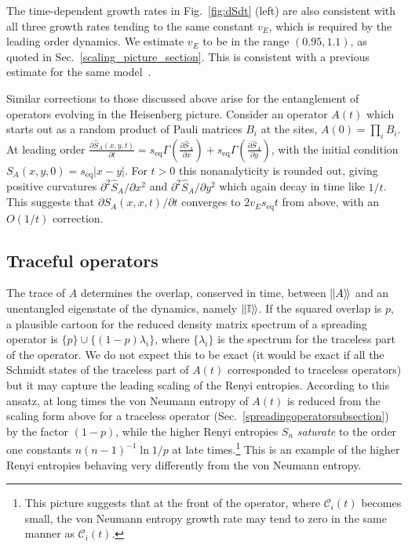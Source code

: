 \documentclass[aps,prx,twocolumn,superscriptaddress,floatfix,nofootinbib,prx]{revtex4}
\newcommand{\f}{\frac}
\renewcommand{\>}{\right\rangle}
\newcommand{\<}{\left\langle}
\newcommand{\lf}{\left(}
\newcommand{\ri}{\right)}
\newcommand{\opket}[1]{|\hspace{-0.15mm}| #1 \rangle\hspace{-0.5mm}\rangle}
\newcommand{\seq}{s_\text{eq}}
\begin{document}
The time-dependent growth rates in Fig.~\ref{fig:dSdt} (left) are also consistent with all three growth rates tending to the same constant $v_E$, which is required by the leading order dynamics. We estimate $v_E$ to be in the range $(0.95,1.1)$, as quoted in Sec.~\ref{scaling_picture_section}.  This is consistent with a previous estimate for the same model~\cite{ms}.

Similar corrections to those discussed above arise for the entanglement of operators evolving in the Heisenberg picture. 
Consider an operator $A(t)$ which starts out as a random product of Pauli matrices $B_i$ at the sites, $A(0) = \prod_i B_i$. At leading order ${\f{\partial \hat S_A (x,y, t)}{\partial t}  = \seq \Gamma \lf  \f{\partial \hat S_A }{\partial x}    \ri
+ \seq \Gamma \lf  \f{\partial \hat S_A }{\partial y}    \ri}$,
with the initial condition $S_A(x,y,0) = \seq |x-y|$. For $t> 0$ this nonanalyticity is rounded out, giving positive curvatures $\partial^2 \hat S_A/\partial x^2$ and $\partial^2 \hat S_A/\partial y^2$ which again decay in time like $1/t$. This suggests that $\partial S_A(x,x,t)/\partial t$ converges to $2 v_E \seq t$ from above, with an $O(1/t)$ correction.


\subsection{Traceful operators}
\label{tracesection}




The trace of $A$ determines the overlap, conserved in time, between $\opket{A}$ and an unentangled eigenstate of the dynamics, namely $\opket{\mathbb{I}}$. If the squared overlap is $p$, a plausible cartoon for the reduced density matrix spectrum of a spreading operator is $\{p \} \cup \{ (1-p) \lambda_i \}$, where $\{\lambda_i\}$ is the spectrum for the traceless part of the operator.
We do not expect this to be exact (it would be exact if all the Schmidt states of the traceless part of $A(t)$ corresponded to traceless operators)  but it may capture the leading scaling of the Renyi entropies. According to this ansatz, at long times the von Neumann entropy of $A(t)$ is reduced from the scaling form above for a traceless operator (Sec.~\ref{spreadingoperatorsubsection})  by the factor $(1-p)$, while the higher Renyi entropies $S_n$ \textit{saturate} to the order one constants $n (n-1)^{-1} \ln 1/p$ at late times.\footnote{This picture suggests that at the front of the operator, where $\mathcal{C}_i(t)$ becomes small, the von Neumann entropy growth rate may tend to zero in the same manner as  $\mathcal{C}_i(t)$.}  This is an example of the higher Renyi entropies behaving very differently from the von Neumann entropy.
\end{document}
